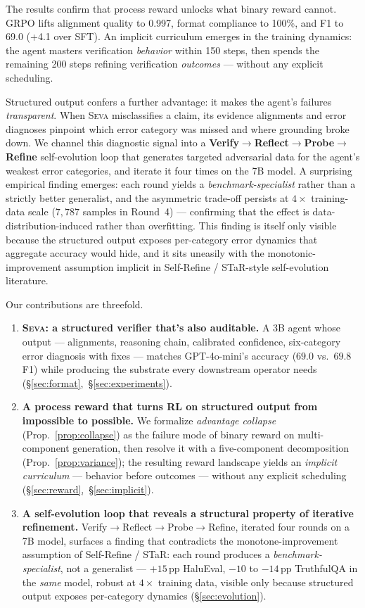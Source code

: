 \documentclass{article}
\newcommand{\seva}{\textsc{Seva}\xspace}
\begin{document}
The results confirm that process reward unlocks what binary reward cannot.
GRPO lifts alignment quality to 0.997, format compliance to 100\%, and F1 to 69.0 (+4.1 over SFT).
An implicit curriculum emerges in the training dynamics: the agent masters verification \emph{behavior} within 150 steps, then spends the remaining 200 steps refining verification \emph{outcomes} --- without any explicit scheduling.

Structured output confers a further advantage: it makes the agent's failures \emph{transparent}.
When \seva misclassifies a claim, its evidence alignments and error diagnoses pinpoint which error category was missed and where grounding broke down.
We channel this diagnostic signal into a \textbf{Verify}$\to$\textbf{Reflect}$\to$\textbf{Probe}$\to$\textbf{Refine} self-evolution loop that generates targeted adversarial data for the agent's weakest error categories, and iterate it four times on the 7B model.
A surprising empirical finding emerges: each round yields a \emph{benchmark-specialist} rather than a strictly better generalist, and the asymmetric trade-off persists at $4\times$ training-data scale ($7{,}787$ samples in Round~4) --- confirming that the effect is data-distribution-induced rather than overfitting.
This finding is itself only visible because the structured output exposes per-category error dynamics that aggregate accuracy would hide, and it sits uneasily with the monotonic-improvement assumption implicit in Self-Refine / STaR-style self-evolution literature.

Our contributions are threefold.
\begin{enumerate}[nosep,leftmargin=*]
  \item \textbf{\seva: a structured verifier that's also auditable.} A 3B agent whose output --- alignments, reasoning chain, calibrated confidence, six-category error diagnosis with fixes --- matches GPT-4o-mini's accuracy ($69.0$ vs.\ $69.8$ F1) while producing the substrate every downstream operator needs (\S\ref{sec:format},~\S\ref{sec:experiments}).
  \item \textbf{A process reward that turns RL on structured output from impossible to possible.} We formalize \emph{advantage collapse} (Prop.~\ref{prop:collapse}) as the failure mode of binary reward on multi-component generation, then resolve it with a five-component decomposition (Prop.~\ref{prop:variance}); the resulting reward landscape yields an \emph{implicit curriculum} --- behavior before outcomes --- without any explicit scheduling (\S\ref{sec:reward},~\S\ref{sec:implicit}).
  \item \textbf{A self-evolution loop that reveals a structural property of iterative refinement.} Verify$\to$Reflect$\to$Probe$\to$Refine, iterated four rounds on a 7B model, surfaces a finding that contradicts the monotone-improvement assumption of Self-Refine / STaR: each round produces a \emph{benchmark-specialist}, not a generalist --- $+15$\,pp HaluEval, $-10$ to $-14$\,pp TruthfulQA in the \emph{same} model, robust at $4{\times}$ training data, visible only because structured output exposes per-category dynamics (\S\ref{sec:evolution}).
\end{enumerate}
\end{document}

